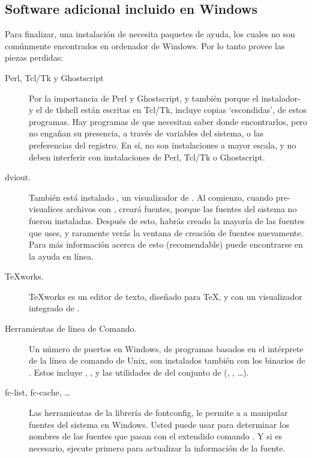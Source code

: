 \documentclass{article}
\begin{document}
\subsection{Software adicional incluido en Windows}
Para finalizar, una instalación de \TL{} necesita paquetes de ayuda, los cuales no
son comúnmente encontrados en ordenador de Windows. Por lo tanto \TL{} provee las
piezas perdidas:

\begin{description} 
\item[Perl, Tcl/Tk y Ghostscript] Por la importancia de Perl
	y Ghostscript, y también porque el instalador- y el \GUI{}
	de tlshell están escritas en Tcl/Tk, \TL{} incluye copias
	`escondidas', de estos programas. Hay programas de \TL{}
	que necesitan saber donde encontrarlos, pero no engañan
	su presencia, a través de variables del sistema, o las
	preferencias del registro. En sí, no son instalaciones a
	mayor escala, y no deben interferir con instalaciones de Perl,
	Tcl/Tk o Ghostscript.

\item[dviout.] También está instalado , un visualizador de
	. Al comienzo, cuando pre-visualices archivos con
	, creará fuentes, porque las fuentes del
	sistema no fueron instaladas. Después de esto, habrás
	creado la mayoría de las fuentes que uses, y raramente
	verás la ventana de creación de fuentes nuevamente. Para
	más información acerca de esto (recomendable) puede
	encontrarse en la ayuda en línea. 

\item[\TeX{}works.] \TeX{}works es un editor de texto, diseñado para
	\TeX{}, y con un visualizador integrado de .

\item[Herramientas de línea de Comando.] Un número de puertos en
	Windows, de programas basados en el intérprete de la línea de
	comando de Unix, son instalados también con los binarios
	de \TL{}. Estos incluye , ,
	y las utilidades de del conjunto de 
	(, , \ldots).

\item[fc-list, fc-cache, \ldots] Las herramientas de la librería de
	fontconfig, le permite a \XeTeX{} a manipular fuentes del
	sistema en Windows. Usted puede usar  para
	determinar los nombres de las fuentes que pasan con el
	extendido comando . Y si es necesario, ejecute
	 primero para actualizar la información
	de la fuente.
\end{description}
\end{document}

